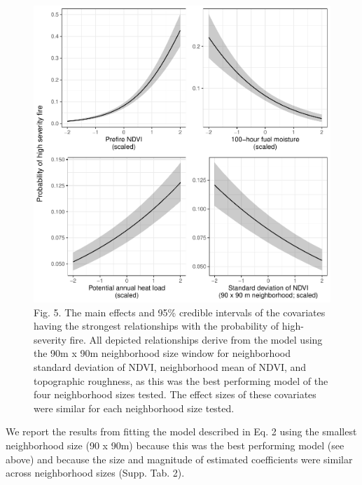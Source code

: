 \documentclass[]{article}
\begin{document}
\begin{figure}
\centering
\includegraphics{../../figures/prob-hi-sev-main-effects-credible-intervals.pdf}
\caption{Fig. 5. The main effects and 95\% credible intervals of the
covariates having the strongest relationships with the probability of
high-severity fire. All depicted relationships derive from the model
using the 90m x 90m neighborhood size window for neighborhood standard
deviation of NDVI, neighborhood mean of NDVI, and topographic roughness,
as this was the best performing model of the four neighborhood sizes
tested. The effect sizes of these covariates were similar for each
neighborhood size tested.}
\end{figure}

We report the results from fitting the model described in Eq. 2 using
the smallest neighborhood size (90 x 90m) because this was the best
performing model (see above) and because the size and magnitude of
estimated coefficients were similar across neighborhood sizes (Supp.
Tab. 2).
\end{document}
